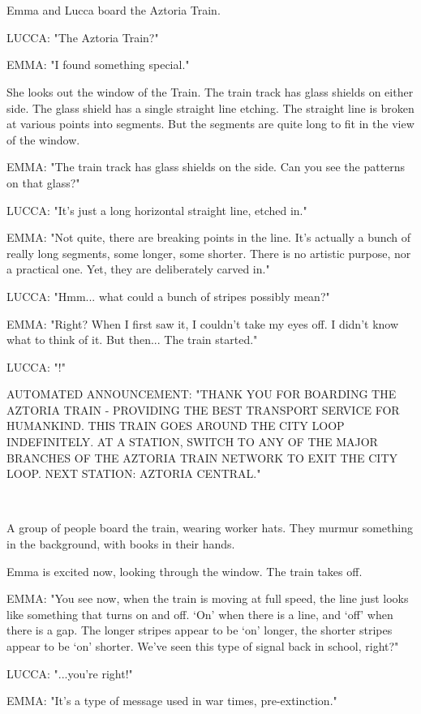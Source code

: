 \documentclass[11pt]{article}
\begin{document}
\ 

\ 

Emma and Lucca board the Aztoria Train.

LUCCA: "The Aztoria Train?"

EMMA: "I found something special."

She looks out the window of the Train.
The train track has glass shields on either side.
The glass shield has a single straight line etching.
The straight line is broken at various points into segments.
But the segments are quite long to fit in the view of the window.

EMMA: "The train track has glass shields on the side.
Can you see the patterns on that glass?"

LUCCA: "It's just a long horizontal straight line, etched in."

EMMA: "Not quite, there are breaking points in the line. 
It's actually a bunch of really long segments, some longer, some shorter.
There is no artistic purpose, nor a practical one.
Yet, they are deliberately carved in."

LUCCA: "Hmm... what could a bunch of stripes possibly mean?"

EMMA: "Right? When I first saw it, I couldn't take my eyes off.
I didn't know what to think of it.
But then... The train started."

LUCCA: "!"

AUTOMATED ANNOUNCEMENT: "THANK YOU FOR BOARDING THE AZTORIA TRAIN - PROVIDING THE BEST TRANSPORT SERVICE FOR HUMANKIND.
THIS TRAIN GOES AROUND THE CITY LOOP INDEFINITELY.
AT A STATION, SWITCH TO ANY OF THE MAJOR BRANCHES OF THE AZTORIA TRAIN NETWORK TO EXIT THE CITY LOOP.
NEXT STATION: AZTORIA CENTRAL."

\ 

A group of people board the train, wearing worker hats.
They murmur something in the background, with books in their hands.

Emma is excited now, looking through the window.
The train takes off.

EMMA: "You see now, when the train is moving at full speed, the line just looks like something that turns on and off.
`On' when there is a line, and `off' when there is a gap.
The longer stripes appear to be `on' longer, the shorter stripes appear to be `on' shorter.
We've seen this type of signal back in school, right?"

LUCCA: "...you're right!"

EMMA: "It's a type of message used in war times, pre-extinction."
\end{document}
